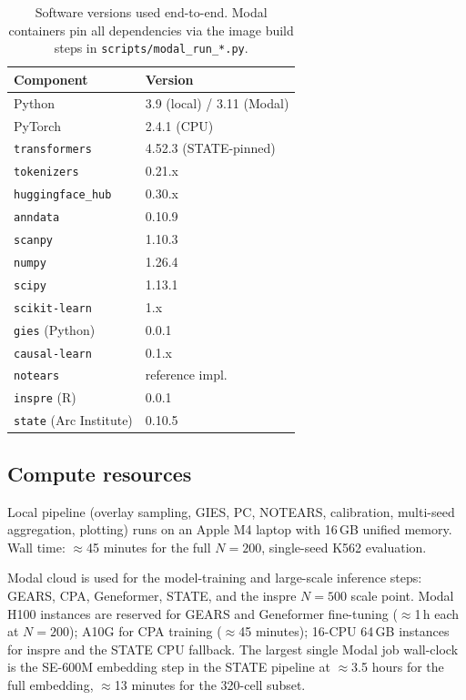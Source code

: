\documentclass{article}
\begin{document}
\begin{table}[h]
\centering
\small
\begin{tabular}{ll}
\toprule
\textbf{Component} & \textbf{Version} \\
\midrule
Python                                & 3.9 (local) / 3.11 (Modal) \\
PyTorch                               & 2.4.1 (CPU) \\
\texttt{transformers}                 & 4.52.3 (STATE-pinned) \\
\texttt{tokenizers}                   & 0.21.x \\
\texttt{huggingface\_hub}             & 0.30.x \\
\texttt{anndata}                      & 0.10.9 \\
\texttt{scanpy}                       & 1.10.3 \\
\texttt{numpy}                        & 1.26.4 \\
\texttt{scipy}                        & 1.13.1 \\
\texttt{scikit-learn}                 & 1.x \\
\texttt{gies} (Python)                & 0.0.1 \\
\texttt{causal-learn}                 & 0.1.x \\
\texttt{notears}                      & reference impl. \\
\texttt{inspre} (R)                   & 0.0.1 \\
\texttt{state} (Arc Institute)        & 0.10.5 \\
\bottomrule
\end{tabular}
\caption{Software versions used end-to-end. Modal containers pin all dependencies via the image build steps in \texttt{scripts/modal\_run\_*.py}.}
\label{tab:software}
\end{table}

\subsection{Compute resources}
\label{app:compute}

Local pipeline (overlay sampling, GIES, PC, NOTEARS, calibration, multi-seed aggregation, plotting) runs on an Apple M4 laptop with 16\,GB unified memory. Wall time: $\approx$45 minutes for the full $N{=}200$, single-seed K562 evaluation.

Modal cloud is used for the model-training and large-scale inference steps: GEARS, CPA, Geneformer, STATE, and the inspre $N{=}500$ scale point. Modal H100 instances are reserved for GEARS and Geneformer fine-tuning ($\approx$1\,h each at $N{=}200$); A10G for CPA training ($\approx$45 minutes); 16-CPU 64\,GB instances for inspre and the STATE CPU fallback. The largest single Modal job wall-clock is the SE-600M embedding step in the STATE pipeline at $\approx$3.5 hours for the full embedding, $\approx$13 minutes for the 320-cell subset.
\end{document}
